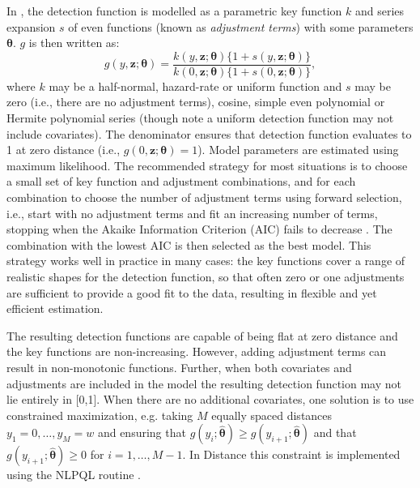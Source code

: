 \documentclass[useAMS,referee,usenatbib]{biom}
\begin{document}
In \cite{Marques:2003vb}, the detection function is modelled as a parametric key function $k$ and series expansion $s$ of even functions (known as \textit{adjustment terms}) with some parameters $\bm{\theta}$. $g$ is then written as:
\begin{equation*}
g(y, \mathbf{z}; \bm{\theta}) = \frac{k(y, \mathbf{z}; \bm{\theta}) \{1+s(y, \mathbf{z}; \bm{\theta})\}}{k(0, \mathbf{z}; \bm{\theta}) \{1+s(0, \mathbf{z}; \bm{\theta})\}},
\end{equation*}
where $k$ may be a half-normal, hazard-rate or uniform function and $s$ may be zero (i.e., there are no adjustment terms), cosine, simple even polynomial or Hermite polynomial series (though note a uniform detection function may not include covariates). The denominator ensures that detection function evaluates to 1 at zero distance (i.e., $g(0, \mathbf{z};\bm{\theta})=1$). Model parameters are estimated using maximum likelihood.  The recommended strategy for most situations is to choose a small set of key function and adjustment combinations, and for each combination to choose the number of adjustment terms using forward selection, i.e., start with no adjustment terms and fit an increasing number of terms, stopping when the Akaike Information Criterion (AIC) fails to decrease  \citep[]{Thomas:2010cf}. The combination with the lowest AIC is then selected as the best model. This strategy works well in practice in many cases: the key functions cover a range of realistic shapes for the detection function, so that often zero or one adjustments are sufficient to provide a good fit to the data, resulting in flexible and yet efficient estimation. 

The resulting detection functions are capable of being flat at zero distance and the key functions are non-increasing. However, adding adjustment terms can result in non-monotonic functions. Further, when both covariates and adjustments are included in the model the resulting detection function may not lie entirely in [0,1]. When there are no additional covariates, one solution is to use constrained maximization, e.g. taking $M$ equally spaced distances $y_1=0, \ldots , y_{M}=w$ and ensuring that $g(y_i;\bm{\hat{\theta}})\geq g(y_{i+1}; \bm{\hat{\theta}})$ and that $g(y_{i+1};\bm{\hat{\theta}})\geq 0$ for $i=1,\ldots,M-1$. In Distance this constraint is implemented using the NLPQL routine \cite[]{Schittkowski:1986wj}.
\end{document}

